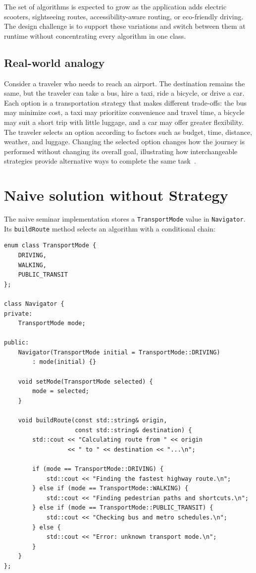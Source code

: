 \documentclass[11pt,a4paper]{report}
\begin{document}
The set of algorithms is expected to grow as the application adds electric
scooters, sightseeing routes, accessibility-aware routing, or eco-friendly
driving. The design challenge is to support these variations and switch between
them at runtime without concentrating every algorithm in one class.

\subsection{Real-world analogy}
Consider a traveler who needs to reach an airport. The destination remains the
same, but the traveler can take a bus, hire a taxi, ride a bicycle, or drive a
car. Each option is a transportation strategy that makes different trade-offs:
the bus may minimize cost, a taxi may prioritize convenience and travel time,
a bicycle may suit a short trip with little luggage, and a car may offer greater
flexibility. The traveler selects an option according to factors such as budget,
time, distance, weather, and luggage. Changing the selected option changes how
the journey is performed without changing its overall goal, illustrating how
interchangeable strategies provide alternative ways to complete the same
task~\cite{refactoringguru}.

\section{Naive solution without Strategy}
The naive seminar implementation stores a \texttt{TransportMode} value in
\texttt{Navigator}. Its \texttt{buildRoute} method selects an algorithm with a
conditional chain:

\begin{lstlisting}[style=cpp]
enum class TransportMode {
    DRIVING,
    WALKING,
    PUBLIC_TRANSIT
};

class Navigator {
private:
    TransportMode mode;

public:
    Navigator(TransportMode initial = TransportMode::DRIVING)
        : mode(initial) {}

    void setMode(TransportMode selected) {
        mode = selected;
    }

    void buildRoute(const std::string& origin,
                    const std::string& destination) {
        std::cout << "Calculating route from " << origin
                  << " to " << destination << "...\n";

        if (mode == TransportMode::DRIVING) {
            std::cout << "Finding the fastest highway route.\n";
        } else if (mode == TransportMode::WALKING) {
            std::cout << "Finding pedestrian paths and shortcuts.\n";
        } else if (mode == TransportMode::PUBLIC_TRANSIT) {
            std::cout << "Checking bus and metro schedules.\n";
        } else {
            std::cout << "Error: unknown transport mode.\n";
        }
    }
};
\end{lstlisting}
\end{document}
